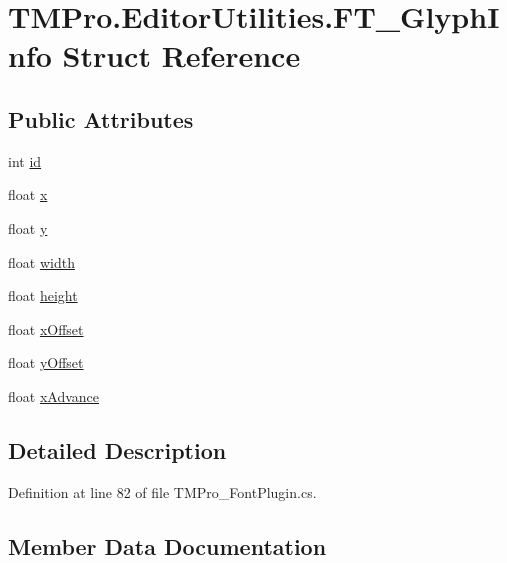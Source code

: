 \hypertarget{struct_t_m_pro_1_1_editor_utilities_1_1_f_t___glyph_info}{}\section{T\+M\+Pro.\+Editor\+Utilities.\+F\+T\+\_\+\+Glyph\+Info Struct Reference}
\label{struct_t_m_pro_1_1_editor_utilities_1_1_f_t___glyph_info}
\subsection*{Public Attributes}
\begin{DoxyCompactItemize}
\item 
int \mbox{\hyperlink{struct_t_m_pro_1_1_editor_utilities_1_1_f_t___glyph_info_a4d16845221c8b09aaadcc81acbab48c8}{id}}
\item 
float \mbox{\hyperlink{struct_t_m_pro_1_1_editor_utilities_1_1_f_t___glyph_info_a89d73dfe840bb743a58cf036aae570b8}{x}}
\item 
float \mbox{\hyperlink{struct_t_m_pro_1_1_editor_utilities_1_1_f_t___glyph_info_ab4a54684e42307ba57fba2bf58300372}{y}}
\item 
float \mbox{\hyperlink{struct_t_m_pro_1_1_editor_utilities_1_1_f_t___glyph_info_a9cc104a777aeffc86925976a5c3debad}{width}}
\item 
float \mbox{\hyperlink{struct_t_m_pro_1_1_editor_utilities_1_1_f_t___glyph_info_a38151b6079db1207d93f4cb00f9912d9}{height}}
\item 
float \mbox{\hyperlink{struct_t_m_pro_1_1_editor_utilities_1_1_f_t___glyph_info_a345fbe6d87887b14de6fc161e54f6b5b}{x\+Offset}}
\item 
float \mbox{\hyperlink{struct_t_m_pro_1_1_editor_utilities_1_1_f_t___glyph_info_afdf4f2b7cf3e2b840811d11ff3533181}{y\+Offset}}
\item 
float \mbox{\hyperlink{struct_t_m_pro_1_1_editor_utilities_1_1_f_t___glyph_info_adcc69a9fb9d88bf52f811573db7347ce}{x\+Advance}}
\end{DoxyCompactItemize}


\subsection{Detailed Description}


Definition at line 82 of file T\+M\+Pro\+\_\+\+Font\+Plugin.\+cs.



\subsection{Member Data Documentation}
\mbox{\label{struct_t_m_pro_1_1_editor_utilities_1_1_f_t___glyph_info_a38151b6079db1207d93f4cb00f9912d9}} 
